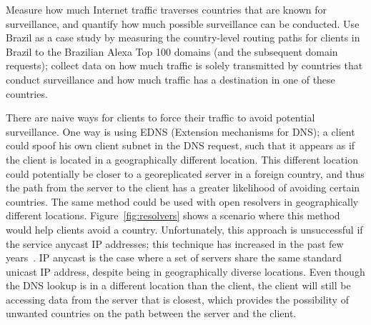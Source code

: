 \begin{thm}
Measure how much Internet traffic traverses countries that are known for surveillance, and quantify how much possible surveillance can be conducted.  Use Brazil as a case study by measuring the country-level routing paths for clients in Brazil to the Brazilian Alexa Top 100 domains (and the subsequent domain requests); collect data on how much traffic is solely transmitted by countries that conduct surveillance and how much traffic has a destination in one of these countries.
\end{thm}

There are naive ways for clients to force their traffic to avoid potential surveillance.  One way is using EDNS (Extension mechanisms for DNS); a client could spoof his own client subnet in the DNS request, such that it appears as if the client is located in a geographically different location.  This different location could potentially be closer to a georeplicated server in a foreign country, and thus the path from the server to the client has a greater likelihood of avoiding certain countries.  The same method could be used with open resolvers in geographically different locations.  Figure~\ref{fig:resolvers} shows a scenario where this method would help clients avoid a country.  Unfortunately, this approach is unsuccessful if the service anycast IP addresses; this technique has increased in the past few years~\cite{cicalese2015characterizing}.  IP anycast is the case where a set of servers share the same standard unicast IP address, despite being in geographically diverse locations.  Even though the DNS lookup is in a different location than the client, the client will still be accessing data from the server that is closest, which provides the possibility of unwanted countries on the path between the server and the client.  

